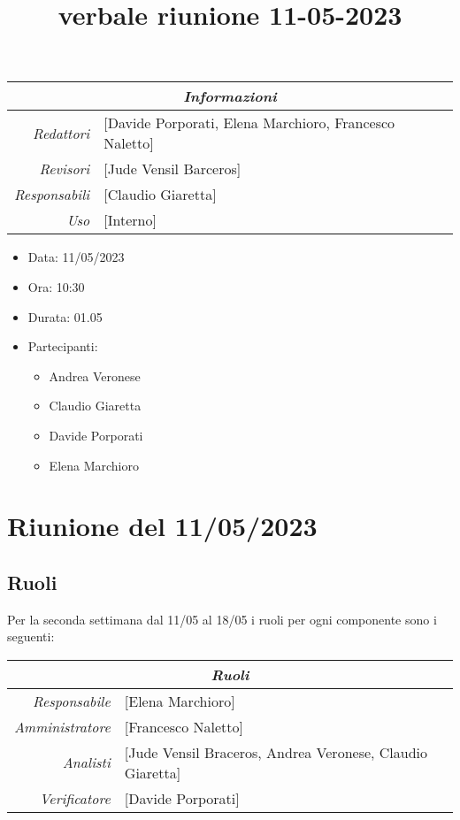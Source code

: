 \documentclass[12pt]{article}
\begin{document}
\graphicspath{ {../../templates/img} }

\title{verbale riunione 11-05-2023}

\firstPage
\maketitle

\begin{center}
\begin{tabular}{r | l}
    \multicolumn{2}{c}{\textit{Informazioni}}\\
    \hline
    
        \textit{Redattori} &
        [Davide Porporati, Elena Marchioro, Francesco Naletto]\makecell{}\\
        \textit{Revisori} &
        [Jude Vensil Barceros]\makecell{}\\
        \textit{Responsabili} &
        [Claudio Giaretta]\makecell{}\\
            \textit{Uso} & 
            [Interno]\makecell{}\\
\end{tabular}
    \begin{itemize}
    \item[] Data: 11/05/2023
    \item[] Ora: 10:30
    \item[] Durata: 01.05
    \item[] Partecipanti:
    \begin{itemize}
    \item[] Andrea Veronese
    \item[] Claudio Giaretta
    \item[] Davide Porporati
    \item[] Elena Marchioro
    \end{itemize}
    \end{itemize}
\end{center}


\tableofcontents
\printindex 
\section{Riunione del 11/05/2023}
\subsection{Ruoli}
Per la seconda settimana dal 11/05 al 18/05 i ruoli per ogni componente sono i seguenti:
\\
\begin{tabular}{r | l}
    \multicolumn{2}{c}{\textit{Ruoli}}\\
    \hline
        \textit{Responsabile} &
        [Elena Marchioro]\makecell{}\\
        \textit{Amministratore} &
        [Francesco Naletto]\makecell{}\\
        \textit{Analisti} &
        [Jude Vensil Braceros, Andrea Veronese, Claudio Giaretta]\makecell{}\\
        \textit{Verificatore} & 
        [Davide Porporati]\makecell{}\\
\end{tabular}
\end{document}
